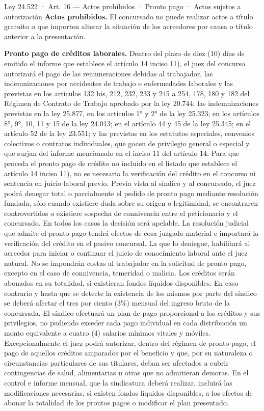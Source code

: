 \documentclass[12pt,oneside]{book}
\begin{document}
\begin{norma}{Ley 24.522 · Art. 16 — Actos prohibidos · Pronto pago · Actos sujetos a autorización}
\textbf{Actos prohibidos.} El concursado no puede realizar actos a título gratuito o que importen alterar la situación de los acreedores por causa o título anterior a la presentación.

\textbf{Pronto pago de créditos laborales.} Dentro del plazo de diez (10) días de emitido el informe que establece el artículo 14 inciso 11), el juez del concurso autorizará el pago de las remuneraciones debidas al trabajador, las indemnizaciones por accidentes de trabajo o enfermedades laborales y las previstas en los artículos 132 bis, 212, 232, 233 y 245 a 254, 178, 180 y 182 del Régimen de Contrato de Trabajo aprobado por la ley 20.744; las indemnizaciones previstas en la ley 25.877, en los artículos 1° y 2° de la ley 25.323; en los artículos 8°, 9°, 10, 11 y 15 de la ley 24.013; en el artículo 44 y 45 de la ley 25.345; en el artículo 52 de la ley 23.551; y las previstas en los estatutos especiales, convenios colectivos o contratos individuales, que gocen de privilegio general o especial y que surjan del informe mencionado en el inciso 11 del artículo 14. Para que proceda el pronto pago de crédito no incluido en el listado que establece el artículo 14 inciso 11), no es necesaria la verificación del crédito en el concurso ni sentencia en juicio laboral previo. Previa vista al síndico y al concursado, el juez podrá denegar total o parcialmente el pedido de pronto pago mediante resolución fundada, sólo cuando existiere duda sobre su origen o legitimidad, se encontraren controvertidos o existiere sospecha de connivencia entre el peticionario y el concursado. En todos los casos la decisión será apelable. La resolución judicial que admite el pronto pago tendrá efectos de cosa juzgada material e importará la verificación del crédito en el pasivo concursal. La que lo deniegue, habilitará al acreedor para iniciar o continuar el juicio de conocimiento laboral ante el juez natural. No se impondrán costas al trabajador en la solicitud de pronto pago, excepto en el caso de connivencia, temeridad o malicia. Los créditos serán abonados en su totalidad, si existieran fondos líquidos disponibles. En caso contrario y hasta que se detecte la existencia de los mismos por parte del síndico se deberá afectar el tres por ciento (3\%) mensual del ingreso bruto de la concursada. El síndico efectuará un plan de pago proporcional a los créditos y sus privilegios, no pudiendo exceder cada pago individual en cada distribución un monto equivalente a cuatro (4) salarios mínimos vitales y móviles. Excepcionalmente el juez podrá autorizar, dentro del régimen de pronto pago, el pago de aquellos créditos amparados por el beneficio y que, por su naturaleza o circunstancias particulares de sus titulares, deban ser afectados a cubrir contingencias de salud, alimentarias u otras que no admitieran demoras. En el control e informe mensual, que la sindicatura deberá realizar, incluirá las modificaciones necesarias, si existen fondos líquidos disponibles, a los efectos de abonar la totalidad de los prontos pagos o modificar el plan presentado.


\end{norma}
\end{document}
